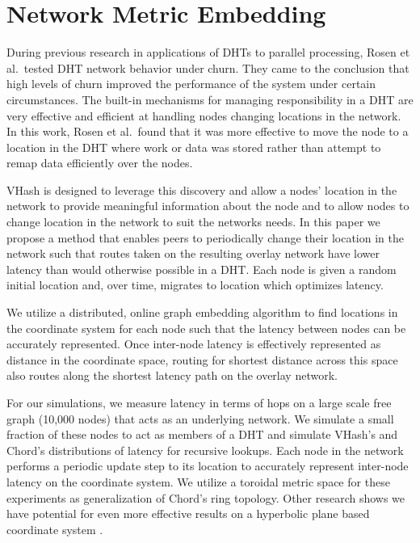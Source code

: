 \documentclass[10pt, conference, letterpaper]{IEEEtran}
\begin{document}
\section{Network Metric Embedding}
\label{networkEmbedding}
During previous research in applications of DHTs \cite{andrew-poster} to parallel processing, Rosen et al.\ tested DHT network behavior under churn. 
They came to the conclusion that high levels of churn improved the performance of the system under certain circumstances.
The built-in mechanisms for managing responsibility in a DHT are very effective and efficient at handling nodes changing locations in the network.
In this work, Rosen et al.\ found that it was more effective to move the node to a location in the DHT where work or data was stored rather than attempt to remap data efficiently over the nodes.

VHash is designed to leverage this discovery and allow a nodes' location in the network to provide meaningful information about the node and to allow nodes to change location in the network to suit the networks needs.
In this paper we propose a method that enables peers to periodically change their location in the network such that routes taken on the resulting overlay network have lower latency than would otherwise possible in a DHT.
Each node is given a random initial location and, over time, migrates to location which optimizes latency.


We utilize a distributed, online graph embedding algorithm to find locations in the coordinate system for each node such that the latency between nodes can be accurately represented.
Once inter-node latency is effectively represented as distance in the coordinate space, routing for shortest distance across this space also routes along the shortest latency path on the overlay network.

For our simulations, we measure latency in terms of hops on a large scale free graph (10,000 nodes) that acts as an underlying network.
We simulate a small fraction of these nodes to act as members of a DHT and simulate VHash's and Chord's distributions of latency for recursive lookups.
Each node in the network performs a periodic update step to its location to accurately represent inter-node latency on the coordinate system.
We utilize a toroidal metric space for these experiments as generalization of Chord's ring topology.
Other research shows we have potential for even more effective results on a hyperbolic plane based coordinate system \cite{papadopoulos2010greedy}.
\end{document}
